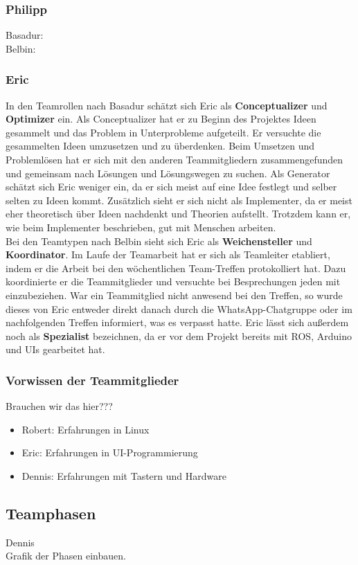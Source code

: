 \documentclass[a4paper,12pt,headsepline]{scrartcl}
\begin{document}
		\subsubsection{Philipp}
		Basadur: \\
		Belbin: 
		\subsubsection{Eric}
		In den Teamrollen nach Basadur schätzt sich Eric als \textbf{Conceptualizer} und \textbf{Optimizer} ein. Als Conceptualizer hat er zu Beginn des Projektes Ideen gesammelt und das Problem in Unterprobleme aufgeteilt. Er versuchte die gesammelten Ideen umzusetzen und zu überdenken. Beim Umsetzen und Problemlösen hat er sich mit den anderen Teammitgliedern zusammengefunden und gemeinsam nach Lösungen und Lösungswegen zu suchen. Als Generator schätzt sich Eric weniger ein, da er sich meist auf eine Idee festlegt und selber selten zu Ideen kommt. Zusätzlich sieht er sich nicht als Implementer, da er meist eher theoretisch über Ideen nachdenkt und Theorien aufstellt. Trotzdem kann er, wie beim Implementer beschrieben, gut mit Menschen arbeiten.\\
		Bei den Teamtypen nach Belbin sieht sich Eric als \textbf{Weichensteller} und \textbf{Koordinator}. Im Laufe der Teamarbeit hat er sich als Teamleiter etabliert, indem er die Arbeit bei den wöchentlichen Team-Treffen protokolliert hat. Dazu koordinierte er die Teammitglieder und versuchte bei Besprechungen jeden mit einzubeziehen. War ein Teammitglied nicht anwesend bei den Treffen, so wurde dieses von Eric entweder direkt danach durch die WhatsApp-Chatgruppe oder im nachfolgenden Treffen informiert, was es verpasst hatte. Eric lässt sich außerdem noch als \textbf{Spezialist} bezeichnen, da er vor dem Projekt bereits mit ROS, Arduino und UIs gearbeitet hat.\\
		
	\subsubsection{Vorwissen der Teammitglieder}
		Brauchen wir das hier???
		\begin{itemize}
			\item Robert: Erfahrungen in Linux
			\item Eric: Erfahrungen in UI-Programmierung
			\item Dennis: Erfahrungen mit Tastern und Hardware
		\end{itemize}
	\subsection{Teamphasen}
		Dennis\\
		Grafik der Phasen einbauen.
\end{document}
